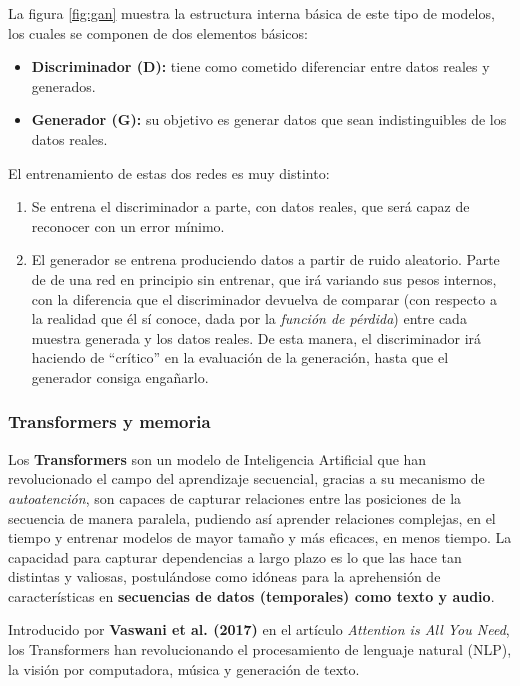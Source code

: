 La figura \ref{fig:gan} muestra la estructura interna básica de este tipo de modelos, los cuales se componen de dos elementos básicos:

\begin{itemize}
    \item \textbf{Discriminador (D):} tiene como cometido diferenciar entre datos reales y generados.
    \item \textbf{Generador (G):} su objetivo es generar datos que sean indistinguibles de los datos reales.
\end{itemize}

El entrenamiento de estas dos redes es muy distinto:
\begin{enumerate}
    \item Se entrena el discriminador a parte, con datos reales, que será capaz de reconocer con un error mínimo.
    \item El generador se entrena produciendo datos a partir de ruido aleatorio. Parte de de una red en principio sin entrenar, que irá variando sus pesos internos, con la diferencia que el discriminador devuelva de comparar (con respecto a la realidad que él sí conoce, dada por la \emph{función de pérdida}) entre cada muestra generada y los datos reales. De esta manera, el discriminador irá haciendo de ``crítico'' en la evaluación de la generación, hasta que el generador consiga engañarlo.
\end{enumerate}

\subsubsection{Transformers y memoria}

Los \textbf{Transformers} son un modelo de Inteligencia Artificial que han revolucionado el campo del aprendizaje secuencial, gracias a su mecanismo de \textit{autoatención}, son capaces de capturar relaciones entre las posiciones de la secuencia de manera paralela, pudiendo así aprender relaciones complejas, en el tiempo y entrenar modelos de mayor tamaño y más eficaces, en menos tiempo. La capacidad para capturar dependencias a largo plazo es lo que las hace tan distintas y valiosas, postulándose como idóneas para la aprehensión de características en \textbf{secuencias de datos (temporales) como texto y audio}.

Introducido por \textbf{Vaswani et al. (2017)} en el artículo \textit{Attention is All You Need}, los Transformers han revolucionando el procesamiento de lenguaje natural (NLP), la visión por computadora, música y generación de texto.


